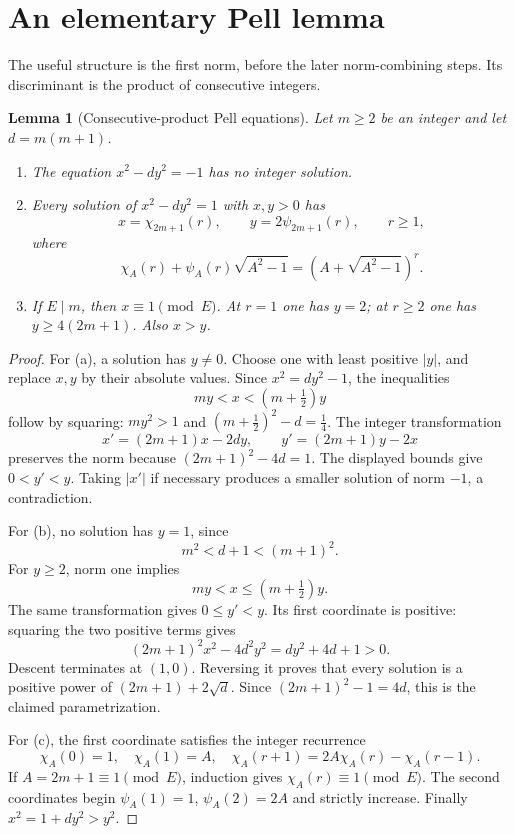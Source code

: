 \documentclass[11pt,letterpaper]{article}
\newtheorem{lemma}[theorem]{Lemma}
\theoremstyle{definition}
\begin{document}
\section{An elementary Pell lemma}\label{sec:pell}

The useful structure is the first norm, before the later norm-combining
steps. Its discriminant is the product of consecutive integers.

\begin{lemma}[Consecutive-product Pell equations]\label{lem:pell}
Let \(m\ge2\) be an integer and let \(d=m(m+1)\).
\begin{enumerate}[label=(\alph*),leftmargin=2em]
 \item The equation \(x^2-dy^2=-1\) has no integer solution.
 \item Every solution of \(x^2-dy^2=1\) with \(x,y>0\) has
 \[
 x=\chi_{2m+1}(r),\qquad y=2\psi_{2m+1}(r),\qquad r\ge1,
 \]
 where
 \[
 \chi_A(r)+\psi_A(r)\sqrt{A^2-1}
      =(A+\sqrt{A^2-1})^r.
 \]
 \item If \(E\mid m\), then \(x\equiv1\pmod E\). At \(r=1\) one has
 \(y=2\); at \(r\ge2\) one has \(y\ge4(2m+1)\). Also \(x>y\).
\end{enumerate}
\end{lemma}

\begin{proof}
For (a), a solution has \(y\ne0\). Choose one with least positive
\(|y|\), and replace \(x,y\) by their absolute values. Since
\(x^2=d y^2-1\), the inequalities
\[
 my<x<(m+\tfrac12)y
\]
follow by squaring: \(my^2>1\) and
\((m+\tfrac12)^2-d=\tfrac14\). The integer transformation
\[
 x'=(2m+1)x-2dy,\qquad y'=(2m+1)y-2x
\]
preserves the norm because \((2m+1)^2-4d=1\). The displayed bounds
give \(0<y'<y\). Taking \(|x'|\) if necessary produces a smaller
solution of norm \(-1\), a contradiction.

For (b), no solution has \(y=1\), since
\[
 m^2<d+1<(m+1)^2.
\]
For \(y\ge2\), norm one implies
\[
 my<x\le(m+\tfrac12)y.
\]
The same transformation gives \(0\le y'<y\). Its first coordinate
is positive: squaring the two positive terms gives
\[
 (2m+1)^2x^2-4d^2y^2=d y^2+4d+1>0.
\]
Descent terminates at \((1,0)\). Reversing it proves that every solution
is a positive power of
\((2m+1)+2\sqrt d\). Since
\((2m+1)^2-1=4d\), this is the claimed parametrization.

For (c), the first coordinate satisfies the integer recurrence
\[
 \chi_A(0)=1,\quad \chi_A(1)=A,\quad
 \chi_A(r+1)=2A\chi_A(r)-\chi_A(r-1).
\]
If \(A=2m+1\equiv1\pmod E\), induction gives
\(\chi_A(r)\equiv1\pmod E\). The second coordinates begin
\(\psi_A(1)=1\), \(\psi_A(2)=2A\) and strictly increase.
Finally \(x^2=1+dy^2>y^2\).
\end{proof}
\end{document}
